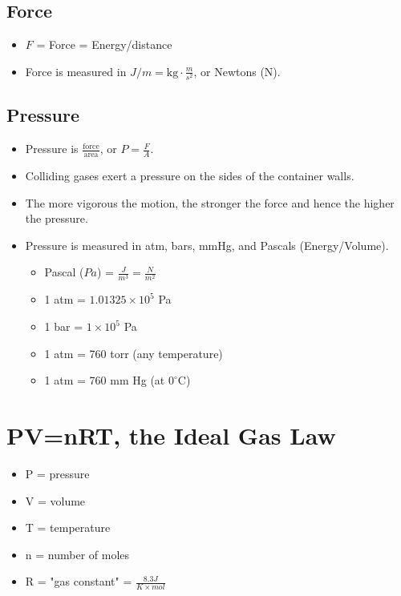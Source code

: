 \documentclass[10pt]{article}
\begin{document}
\subsection*{Force}
\begin{itemize}
    \item $F$ = Force = Energy/distance
    \item Force is measured in $J/m = \text{kg} \cdot \frac{m}{s^2}$, or Newtons (N).
\end{itemize}

\subsection*{Pressure}
\begin{itemize}
    \item Pressure is $\frac{\text{force}}{\text{area}}$, or $P = \frac{F}{A}$.
    \item Colliding gases exert a pressure on the sides of the container walls.
    \item The more vigorous the motion, the stronger the force and hence the higher the pressure.
    \item Pressure is measured in atm, bars, mmHg, and Pascals (Energy/Volume).
    \begin{itemize}
        \item Pascal ($Pa$) = $\frac{J}{m^3} = \frac{N}{m^2}$
        \item 1 atm = $1.01325 \times 10^5$ Pa
        \item 1 bar = $1 \times 10^5$ Pa
        \item 1 atm = 760 torr (any temperature)
        \item 1 atm = 760 mm Hg (at $0^\circ$C)
    \end{itemize}
\end{itemize}

\section*{PV=nRT, the Ideal Gas Law}
\begin{itemize}
    \item P = pressure
    \item V = volume
    \item T = temperature
    \item n = number of moles
    \item R = "gas constant" = $\frac{8.3 J}{K \times mol}$
\end{itemize}
\end{document}
